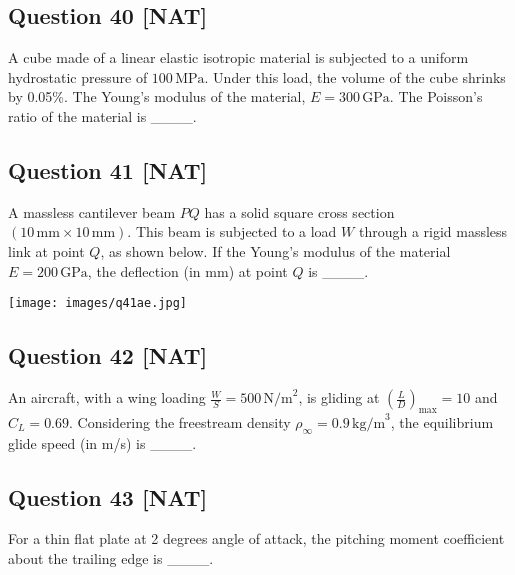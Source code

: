 \documentclass[12pt,a4paper]{article}
\begin{document}
\vspace{0.5cm}




\subsection*{Question 40 [NAT]}
A cube made of a linear elastic isotropic material is subjected to a uniform hydrostatic pressure of \( 100 \, \text{MPa} \). Under this load, the volume of the cube shrinks by 0.05\%. The Young’s modulus of the material, \( E = 300 \, \text{GPa} \). The Poisson’s ratio of the material is \_\_\_\_.

\vspace{0.5cm}

\subsection*{Question 41 [NAT]}
A massless cantilever beam \( PQ \) has a solid square cross section \( (10 \, \text{mm} \times 10 \, \text{mm}) \). This beam is subjected to a load \( W \) through a rigid massless link at point \( Q \), as shown below. If the Young’s modulus of the material \( E = 200 \, \text{GPa} \), the deflection (in mm) at point \( Q \) is \_\_\_\_.

\texttt{[image: images/q41ae.jpg]}

\vspace{0.5cm}

\subsection*{Question 42 [NAT]}
An aircraft, with a wing loading \( \frac{W}{S} = 500 \, \text{N/m}^2 \), is gliding at \( \left( \frac{L}{D} \right)_{\text{max}} = 10 \) and \( C_L = 0.69 \). Considering the freestream density \( \rho_\infty = 0.9 \, \text{kg/m}^3 \), the equilibrium glide speed (in m/s) is \_\_\_\_.

\vspace{0.5cm}

\subsection*{Question 43 [NAT]}
For a thin flat plate at 2 degrees angle of attack, the pitching moment coefficient about the trailing edge is \_\_\_\_.

\vspace{0.5cm}
\end{document}
